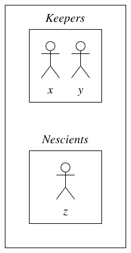 \documentclass[aspectratio=169]{beamer}
\begin{document}
\begin{frame}
\begin{columns}[c]
\centering
\includegraphics[width=\linewidth]{images/s1.png}

\end{columns}

\end{frame}
\end{document}
